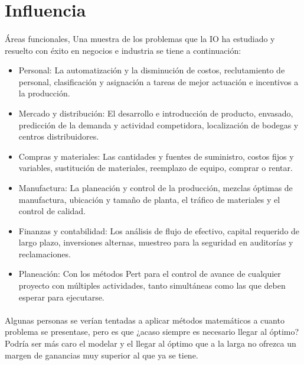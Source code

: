 \documentclass[12pt, a4paper,spanish]{article}
\begin{document}
	\section{Influencia}
		\paragraph{}
		Áreas funcionales, Una muestra de los problemas que la IO ha estudiado y resuelto con éxito en negocios e industria se tiene a continuación:

		\begin{itemize}

			\item Personal: La automatización y la disminución de costos, reclutamiento de personal, clasificación y asignación a tareas de mejor actuación e incentivos a la producción.

			\item Mercado y distribución: El desarrollo e introducción de producto, envasado, predicción de la demanda y actividad competidora, localización de bodegas y centros distribuidores.

			\item Compras y materiales: Las cantidades y fuentes de suministro, costos fijos y variables, sustitución de materiales, reemplazo de equipo, comprar o rentar.

			\item Manufactura: La planeación y control de la producción, mezclas óptimas de manufactura, ubicación y tamaño de planta, el tráfico de materiales y el control de calidad.

			\item Finanzas y contabilidad: Los análisis de flujo de efectivo, capital requerido de largo plazo, inversiones alternas, muestreo para la seguridad en auditorías y reclamaciones.

			\item Planeación: Con los métodos Pert para el control de avance de cualquier proyecto con múltiples actividades, tanto simultáneas como las que deben esperar para ejecutarse.

		\end{itemize}

		\paragraph{}
		Algunas personas se verían tentadas a aplicar métodos matemáticos a cuanto problema se presentase, pero es que ¿acaso siempre es necesario llegar al óptimo? Podría ser más caro el modelar y el llegar al óptimo que a la larga no ofrezca un margen de ganancias muy superior al que ya se tiene.
\end{document}
